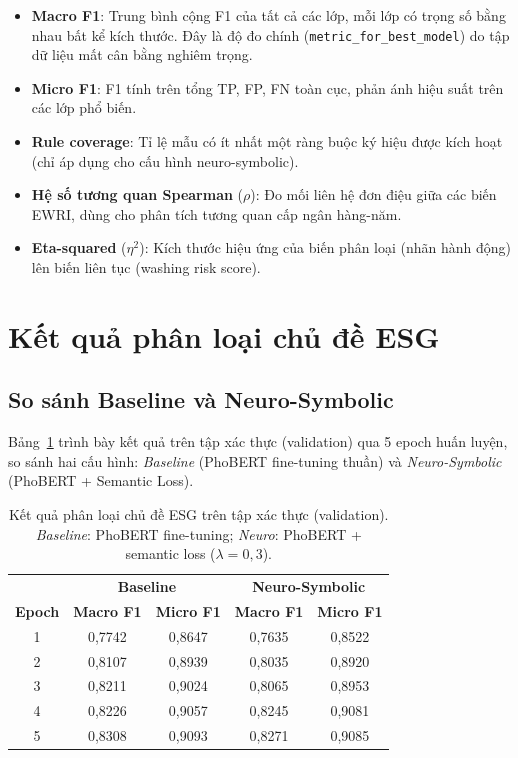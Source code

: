 \begin{itemize}
    \item \textbf{Macro F1}: Trung bình cộng F1 của tất cả các lớp, mỗi lớp có trọng số bằng nhau bất kể kích thước. Đây là độ đo chính (\texttt{metric\_for\_best\_model}) do tập dữ liệu mất cân bằng nghiêm trọng.
    \item \textbf{Micro F1}: F1 tính trên tổng TP, FP, FN toàn cục, phản ánh hiệu suất trên các lớp phổ biến.
    \item \textbf{Rule coverage}: Tỉ lệ mẫu có ít nhất một ràng buộc ký hiệu được kích hoạt (chỉ áp dụng cho cấu hình neuro-symbolic).
    \item \textbf{Hệ số tương quan Spearman} ($\rho$): Đo mối liên hệ đơn điệu giữa các biến EWRI, dùng cho phân tích tương quan cấp ngân hàng-năm.
    \item \textbf{Eta-squared} ($\eta^2$): Kích thước hiệu ứng của biến phân loại (nhãn hành động) lên biến liên tục (washing risk score).
\end{itemize}


\section{Kết quả phân loại chủ đề ESG}
\label{sec:topic_results}

\subsection{So sánh Baseline và Neuro-Symbolic}
\label{subsec:topic_baseline_vs_neuro}

Bảng~\ref{tab:topic_val} trình bày kết quả trên tập xác thực (validation) qua 5 epoch huấn luyện, so sánh hai cấu hình: \textit{Baseline} (PhoBERT fine-tuning thuần) và \textit{Neuro-Symbolic} (PhoBERT + Semantic Loss).

\begin{table}[H]
\centering
\caption{Kết quả phân loại chủ đề ESG trên tập xác thực (validation). \textit{Baseline}: PhoBERT fine-tuning; \textit{Neuro}: PhoBERT + semantic loss ($\lambda = 0{,}3$).}
\label{tab:topic_val}
\begin{tabular}{c|cc|cc}
\toprule
 & \multicolumn{2}{c|}{\textbf{Baseline}} & \multicolumn{2}{c}{\textbf{Neuro-Symbolic}} \\
\textbf{Epoch} & \textbf{Macro F1} & \textbf{Micro F1} & \textbf{Macro F1} & \textbf{Micro F1} \\
\midrule
1 & 0,7742 & 0,8647 & 0,7635 & 0,8522 \\
2 & 0,8107 & 0,8939 & 0,8035 & 0,8920 \\
3 & 0,8211 & 0,9024 & 0,8065 & 0,8953 \\
4 & 0,8226 & 0,9057 & 0,8245 & 0,9081 \\
5 & 0,8308 & 0,9093 & 0,8271 & 0,9085 \\
\bottomrule
\end{tabular}
\end{table}

